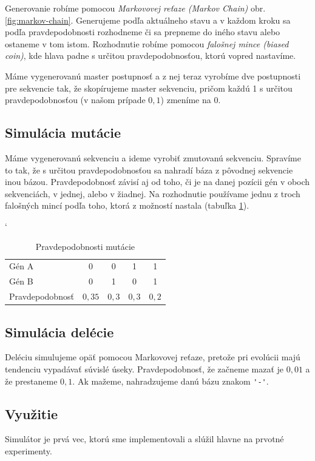 Generovanie robíme pomocou \textit{Markovovej reťaze (Markov Chain)} obr. \ref{fig:markov-chain}. Generujeme podľa aktuálneho stavu a v každom kroku sa podľa pravdepodobnosti rozhodneme či sa prepneme do iného stavu alebo ostaneme v tom istom. Rozhodnutie robíme pomocou \textit{falošnej mince (biased coin)}, kde hlava padne s určitou pravdepodobnosťou, ktorú vopred nastavíme.


Máme vygenerovanú master postupnosť a z nej teraz vyrobíme dve postupnosti pre sekvencie tak, že skopírujeme master sekvenciu, pričom každú 1 s určitou pravdepodobnosťou (v našom prípade $0,1$) zmeníme na 0.

\subsection{Simulácia mutácie}

Máme vygenerovanú sekvenciu a ideme vyrobiť zmutovanú sekvenciu. Spravíme to tak, že s určitou pravdepodobnosťou sa nahradí báza z pôvodnej sekvencie inou bázou. Pravdepodobnosť závisí aj od toho, či je na danej pozícii gén v oboch sekvenciách, v jednej, alebo v žiadnej. Na rozhodnutie používame jednu z troch falošných mincí podľa toho, ktorá z možností nastala (tabuľka \ref{tab:mutation-prob}).

\begin{table}[h]
\catcode` %
\centering
\begin{tabular}{lcccc}
Gén A & 0 & 0 & 1 & 1\\
Gén B & 0 & 1 & 0 & 1\\
Pravdepodobnosť & $0,35$ & $0,3$ & $0,3$ & $0,2$\\
\end{tabular}
\caption{Pravdepodobnosti mutácie}
\label{tab:mutation-prob}
\end{table}

\subsection{Simulácia delécie}
Deléciu simulujeme opäť pomocou Markovovej reťaze, pretože pri evolúcii majú tendenciu vypadávať súvislé úseky. Pravdepodobnosť, že začneme mazať je $0,01$ a že prestaneme $0,1$.
Ak mažeme, nahradzujeme danú bázu znakom {\verb+'-'+}.

\subsection{Využitie}

Simulátor je prvá vec, ktorú sme implementovali a slúžil hlavne na prvotné experimenty.
